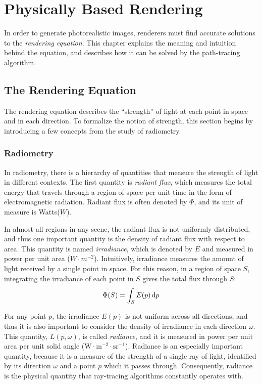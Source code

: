 \chapter{Physically Based Rendering}

In order to generate photorealistic images, renderers must find accurate solutions to the \textit{rendering equation}. This chapter explains the meaning and intuition behind the equation, and describes how it can be solved by the path-tracing algorithm.

\section{The Rendering Equation}

The rendering equation describes the ``strength'' of light at each point in space and in each direction. To formalize the notion of strength, this section begins by introducing a few concepts from the study of radiometry.

\subsection{Radiometry}

In radiometry, there is a hierarchy of quantities that measure the strength of light in different contexts. The first quantity is \textit{radiant flux}, which measures the total energy that travels through a region of space per unit time in the form of electromagnetic radiation. Radiant flux is often denoted by $\Phi$, and its unit of measure is Watts($W$). 

In almost all regions in any scene, the radiant flux is not uniformly distributed, and thus one important quantity is the density of radiant flux with respect to area. This quantity is named \textit{irradiance}, which is denoted by $E$ and measured in power per unit area ($W\cdot m^{-2}$). Intuitively, irradiance measures the amount of light received by a single point in space. For this reason, in a region of space $S$, integrating the irradiance of each point in $S$ gives the total flux through $S$:
\begin{align}
    \Phi(S) = \int_S E(p) \,\mathrm{d} p 
    \label{irradiance integral}
\end{align}

For any point $p$, the irradiance $E(p)$ is not uniform across all directions, and thus it is also important to consider the density of irradiance in each direction $\omega$. This quantity, $L(p,\omega)$, is called \textit{radiance}, and it is measured in power per unit area per unit solid angle ($\text{W}\cdot\text{m}^{-2}\cdot \text{sr}^{-1}$). Radiance is an especially important quantity, because it is a measure of the strength of a single ray of light, identified by its direction $\omega$ and a point $p$ which it passes through. Consequently, radiance is the physical quantity that ray-tracing algorithms constantly operates with. 



